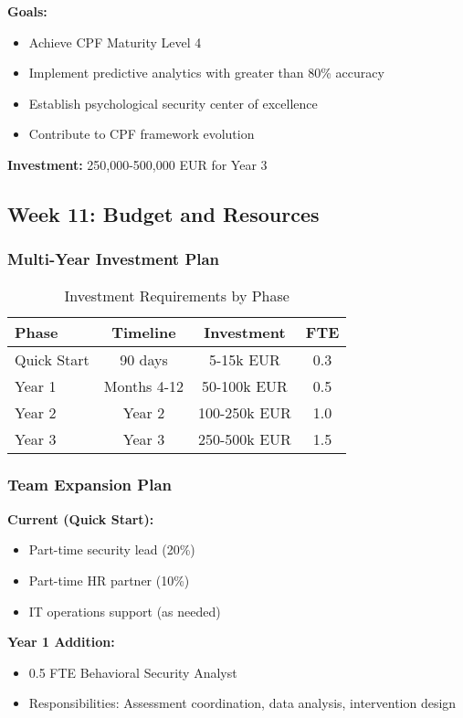 \documentclass[11pt,a4paper]{article}
\begin{document}
\textbf{Goals:}
\begin{itemize}
\item Achieve CPF Maturity Level 4
\item Implement predictive analytics with greater than 80\% accuracy
\item Establish psychological security center of excellence
\item Contribute to CPF framework evolution
\end{itemize}

\textbf{Investment:} 250,000-500,000 EUR for Year 3

\subsection{Week 11: Budget and Resources}

\subsubsection{Multi-Year Investment Plan}

\begin{table}[h]
\centering
\caption{Investment Requirements by Phase}
\begin{tabular}{lccc}
\toprule
\textbf{Phase} & \textbf{Timeline} & \textbf{Investment} & \textbf{FTE} \\
\midrule
Quick Start & 90 days & 5-15k EUR & 0.3 \\
Year 1 & Months 4-12 & 50-100k EUR & 0.5 \\
Year 2 & Year 2 & 100-250k EUR & 1.0 \\
Year 3 & Year 3 & 250-500k EUR & 1.5 \\
\bottomrule
\end{tabular}
\end{table}

\subsubsection{Team Expansion Plan}

\textbf{Current (Quick Start):}
\begin{itemize}
\item Part-time security lead (20\%)
\item Part-time HR partner (10\%)
\item IT operations support (as needed)
\end{itemize}

\textbf{Year 1 Addition:}
\begin{itemize}
\item 0.5 FTE Behavioral Security Analyst
\item Responsibilities: Assessment coordination, data analysis, intervention design
\end{itemize}
\end{document}
